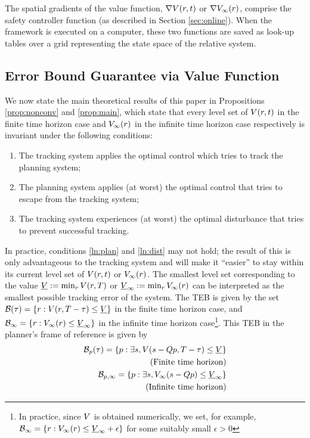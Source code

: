 The spatial gradients of the value function, $\nabla V(r, t)$ or $\nabla V_\infty(r)$, comprise the safety controller function (as described in Section \ref{sec:online}). 
When the framework is executed on a computer, these two functions are saved as look-up tables over a grid representing the state space of the relative system.
 
\subsection{Error Bound Guarantee via Value Function} \label{sec:proofs}
We now state the main theoretical results of this paper in Propositions \ref{prop:nonconv} and \ref{prop:main}, which state that every level set of $V(r, t)$ in the finite time horizon case and $V_\infty(r)$ in the infinite time horizon case respectively is invariant under the following conditions:
\begin{enumerate}
  \item The tracking system applies the optimal control which tries to track the planning system;
  \item The planning system applies (at worst) the optimal control that tries to escape from the tracking system; \label{ln:plan}
  \item The tracking system experiences (at worst) the optimal disturbance that tries to prevent successful tracking. \label{ln:dist}
\end{enumerate}
In practice, conditions \ref{ln:plan} and \ref{ln:dist} may not hold; the result of this is only advantageous to the tracking system and will make it ``easier'' to stay within its current level set of $V(r, t)$ or $V_\infty(r)$. 
The smallest level set corresponding to the value $\underline{V} := \min_{r} V(r,T)$ or $\underline{V}_\infty := \min_{r} V_\infty(r)$ can be interpreted as the smallest possible tracking error of the system. 
The TEB is given by the set $\mathcal B(\tau) = \{r: V(r, T - \tau) \le \underline{V}\}$ in the finite time horizon case, and $\mathcal B_\infty = \{r: V_\infty(r) \le \underline{V}_\infty\}$ in the infinite time horizon case\footnote{In practice, since $V$ is obtained numerically, we set, for example, $\mathcal B_\infty = \{r: V_\infty(r) \le \underline{V}_\infty + \epsilon\}$ for some suitably small $\epsilon>0$}. 
This TEB in the planner's frame of reference is given by
\begin{equation} \label{eq:TEBp}
\begin{aligned}
\TEB_\pstate(\tau) = \{\pstate: \exists s, \valfunc(\tstate-\ptmat\pstate, \thor-\tau) \le \underline\valfunc\} \\
\quad \text{(Finite time horizon)}\\
\TEB_{\pstate, \infty} = \{\pstate: \exists s, \valfunc_\infty(\tstate-\ptmat\pstate) \le \underline\valfunc_\infty\} \\
\quad \text{(Infinite time horizon)}\\
\end{aligned}
\end{equation}

